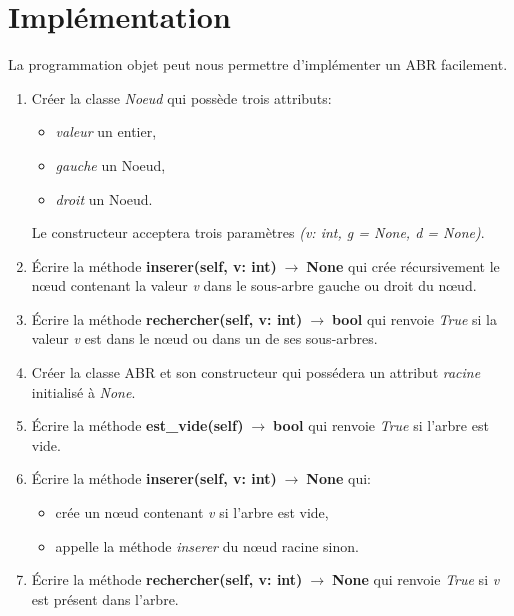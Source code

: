 \documentclass[a4paper,11pt]{article}
\begin{document}
\section{Implémentation}
La programmation objet peut nous permettre d'implémenter un ABR facilement.
\begin{activite}
    \begin{enumerate}
        \item Créer la classe \emph{Noeud} qui possède trois attributs:
              \begin{itemize}
                  \item \emph{valeur} un entier,
                  \item \emph{gauche} un Noeud,
                  \item \emph{droit} un Noeud.
              \end{itemize}
              Le constructeur acceptera trois paramètres \emph{(v: int, g = None, d = None)}.
        \item Écrire la méthode \textbf{inserer(self, v: int)$\;\rightarrow\;$None} qui crée récursivement le nœud contenant la valeur \emph{v} dans le sous-arbre gauche ou droit du nœud.
        \item Écrire la méthode \textbf{rechercher(self, v: int)$\;\rightarrow\;$bool} qui renvoie \emph{True} si la valeur \emph{v} est dans le nœud ou dans un de ses sous-arbres.
        \item Créer la classe ABR et son constructeur qui possédera un attribut \emph{racine} initialisé à \emph{None}.
        \item Écrire la méthode \textbf{est\_vide(self)$\;\rightarrow\;$bool} qui renvoie \emph{True} si l'arbre est vide.
        \item Écrire la méthode \textbf{inserer(self, v: int)$\;\rightarrow\;$None} qui:
              \begin{itemize}
                  \item crée un nœud contenant \emph{v} si l'arbre est vide,
                  \item appelle la méthode \emph{inserer} du nœud racine sinon.
              \end{itemize}
        \item Écrire la méthode \textbf{rechercher(self, v: int)$\;\rightarrow\;$None} qui renvoie \emph{True} si \emph{v} est présent dans l'arbre.
    \end{enumerate}
\end{activite}
\end{document}

